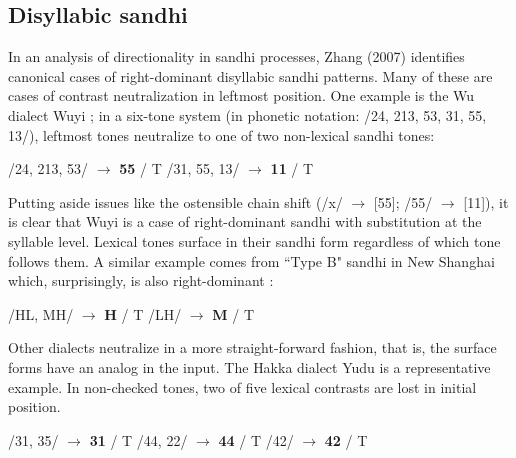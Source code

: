 \documentclass{article}
\begin{document}
\subsection{Disyllabic sandhi}
In an analysis of directionality in sandhi processes, Zhang (2007) identifies canonical cases of right-dominant disyllabic sandhi patterns\cite{zhang2007}. Many of these are cases of contrast neutralization in leftmost position. One example is the Wu dialect Wuyi \cite{fu1984}; in a six-tone system (in phonetic notation: /24, 213, 53, 31, 55, 13/), leftmost tones neutralize to one of two non-lexical sandhi tones: 
\begin{exe}
\ex
\begin{xlist}
	\ex /24, 213, 53/ $\rightarrow$ \textbf{55} / \underline{\hspace{1em}} T
	\ex /31, 55, 13/ $\rightarrow$ \textbf{11} / \underline{\hspace{1em}} T
\end{xlist}
\end{exe}
Putting aside issues like the ostensible chain shift (/x/ $\rightarrow$ [55]; /55/ $\rightarrow$ [11]), it is clear that Wuyi is a case of right-dominant sandhi with substitution at the syllable level. Lexical tones surface in their sandhi form regardless of which tone follows them. A similar example comes from ``Type B" sandhi in New Shanghai which, surprisingly, is also right-dominant \cite{xuetal1981}:
 \begin{exe}
\ex
\begin{xlist}
	\ex /HL, MH/ $\rightarrow$ \textbf{H} / \underline{\hspace{1em}} T
	\ex /LH/ $\rightarrow$ \textbf{M} / \underline{\hspace{1em}} T
\end{xlist}
\end{exe}
\par
Other dialects neutralize in a more straight-forward fashion, that is, the surface forms have an analog in the input. The Hakka dialect Yudu is a representative example\cite{xie1992}. In non-checked tones, two of five lexical contrasts are lost in initial position.
\begin{exe}
\ex
\begin{xlist}
	\ex /31, 35/ $\rightarrow$ \textbf{31} / \underline{\hspace{1em}} T
	\ex /44, 22/ $\rightarrow$ \textbf{44} / \underline{\hspace{1em}} T
	\ex /42/ $\rightarrow$ \textbf{42} / \underline{\hspace{1em}} T	
\end{xlist}
\end{exe}
\end{document}
